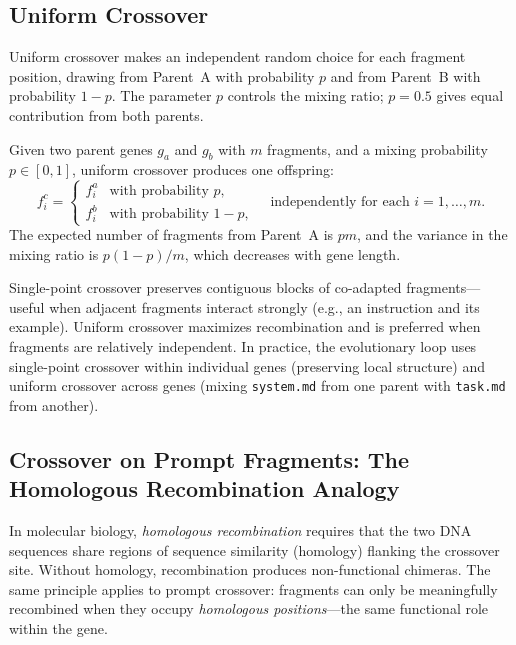 \subsection{Uniform Crossover}

Uniform crossover makes an independent random choice for each fragment position, drawing from Parent~A with probability $p$ and from Parent~B with probability $1 - p$. The parameter $p$ controls the mixing ratio; $p = 0.5$ gives equal contribution from both parents.

\begin{definition}
Given two parent genes $g_a$ and $g_b$ with $m$ fragments, and a mixing probability $p \in [0, 1]$, uniform crossover produces one offspring:
\begin{equation}
f_i^c = \begin{cases} f_i^a & \text{with probability } p, \\ f_i^b & \text{with probability } 1 - p, \end{cases} \quad \text{independently for each } i = 1, \ldots, m.
\end{equation}
The expected number of fragments from Parent~A is $pm$, and the variance in the mixing ratio is $p(1-p)/m$, which decreases with gene length.
\end{definition}

\begin{implnote}
Single-point crossover preserves contiguous blocks of co-adapted fragments---useful when adjacent fragments interact strongly (e.g., an instruction and its example). Uniform crossover maximizes recombination and is preferred when fragments are relatively independent. In practice, the evolutionary loop uses single-point crossover within individual genes (preserving local structure) and uniform crossover across genes (mixing \texttt{system.md} from one parent with \texttt{task.md} from another).
\end{implnote}

\subsection{Crossover on Prompt Fragments: The Homologous Recombination Analogy}

In molecular biology, \emph{homologous recombination} requires that the two DNA sequences share regions of sequence similarity (homology) flanking the crossover site. Without homology, recombination produces non-functional chimeras. The same principle applies to prompt crossover: fragments can only be meaningfully recombined when they occupy \emph{homologous positions}---the same functional role within the gene.

